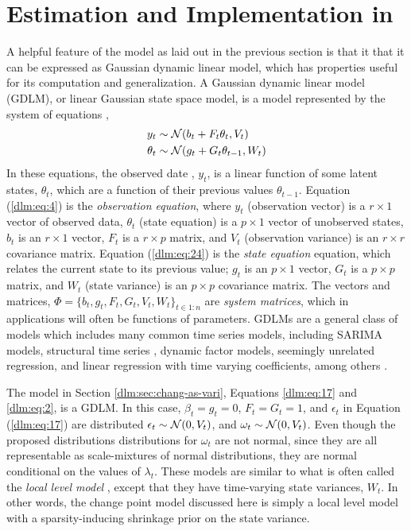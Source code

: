\section{Estimation and Implementation in \Stan{}}
\label{dlm:sec:estimation}

A helpful feature of the model as laid out in the previous section is that it that it can be expressed as Gaussian dynamic linear model, which has properties useful for its computation and generalization.
A Gaussian dynamic linear model (GDLM), or linear Gaussian state space model, is a model represented by the system of equations \parencites{DurbinKoopman2012}{WestHarrison1997}{PetrisPetroneEtAl2009}[Ch 6]{ShumwayStoffer2010},
\begin{align}
  \label{dlm:eq:4}
  y_{t} &\sim \mathcal{N}\mathopen{}\left(b_{t} + F_{t} \theta_{t}, V_{t}\right)\mathclose{} \\
  \label{dlm:eq:24}
  \theta_{t} &\sim \mathcal{N}\mathopen{}\left(g_{t} + G_{t} \theta_{t - 1}, W_{t}\right)\mathclose{} 
\end{align}
In these equations, the observed date , $y_{t}$, is a linear function of some latent states, $\theta_{t}$, which are a function of their previous values $\theta_{t-1}$.
Equation (\ref{dlm:eq:4}) is the \textit{observation equation}, where $y_{t}$ (observation vector) is a $r \times 1$ vector of observed data, $\theta_{t}$ (state equation) is a $p \times 1$ vector of unobserved states, $b_{t}$ is an $r \times 1$ vector, $F_{t}$ is a $r \times p$ matrix, and $V_{t}$ (observation variance) is an $r \times r$ covariance matrix.
Equation (\ref{dlm:eq:24}) is the \textit{state equation} equation, which relates the current state to its previous value; $g_{t}$ is an $p \times 1$ vector, $G_{t}$ is a $p \times p$ matrix, and $W_{t}$ (state variance) is an $p \times p$ covariance matrix.
The vectors and matrices, $\Phi = \{ b_{t}, g_{t}, F_{t}, G_{t}, V_{t}, W_{t} \}_{t \in 1:n}$ are \textit{system matrices}, which in applications will often be functions of parameters.
GDLMs are a general class of models which includes many common time series models, including SARIMA models, structural time series \parencite{Harvey1990}, dynamic factor models, seemingly unrelated regression, and linear regression with time varying coefficients, among others \parencite[Ch. 3]{DurbinKoopman2012}. 

The model in Section \ref{dlm:sec:chang-as-vari}, Equations \eqref{dlm:eq:17} and \eqref{dlm:eq:2}, is a GDLM.
In this case, $\beta_{t} = g_{t} = 0$, $F_{t} = G_{t} = 1$, and $\epsilon_{t}$ in Equation (\ref{dlm:eq:17}) are distributed $\epsilon_{t} \sim \mathcal{N}\mathopen{}\left(0, V_{t}\right)\mathclose{}$, and $\omega_{t} \sim \mathcal{N}\mathopen{}\left(0, V_{t}\right)\mathclose{}$.
Even though the proposed distributions distributions for $\omega_{t}$ are not normal, since they are all representable as scale-mixtures of normal distributions, they are normal conditional on the values of $\lambda_{t}$.%
These models are similar to what is often called the \textit{local level model} \parencite[Ch 2.]{DurbinKoopman2012}, except that they have time-varying state variances, $W_{t}$.
In other words, the change point model discussed here is simply a local level model with a sparsity-inducing shrinkage prior on the state variance.

